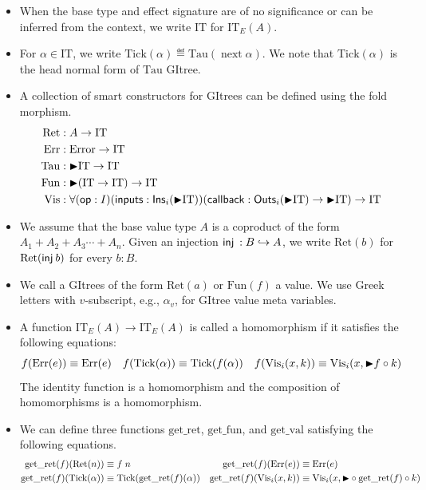 \documentclass{article}
\theoremstyle{definition}
\theoremstyle{plain}
\theoremstyle{remark}
\newcommand{\Error}{\mathrm{Error}}
\newcommand{\Ins}{\mathsf{Ins}}
\newcommand{\Outs}{\mathsf{Outs}}
\newcommand{\IT}{\mathrm{IT}}
\newcommand{\gRet}{\mathrm{Ret}}
\newcommand{\gErr}{\mathrm{Err}}
\newcommand{\gTau}{\mathrm{Tau}}
\newcommand{\gVis}{\mathrm{Vis}}
\newcommand{\gFun}{\mathrm{Fun}}
\newcommand{\Tick}{\mathrm{Tick}}
\DeclareMathOperator*{\Next}{\mathrm{next}}
\newcommand{\getret}{\mathrm{get\_ret}}
\newcommand{\getfun}{\mathrm{get\_fun}}
\newcommand{\getval}{\mathrm{get\_val}}
\begin{document}
\begin{itemize}
  \item When the base type and effect signature are of no significance or can be inferred from the context, we write \(\IT\) for \(\IT_E(A)\).
  \item For \(\alpha \in \IT\), we write \(\Tick(\alpha) \eqdef \gTau(\Next \alpha)\).
    We note that \(\Tick(\alpha)\) is the head normal form of \(\gTau\) GItree.
  \item A collection of smart constructors for GItrees can be defined using the fold morphism.
    \begin{align*}
      \gRet &: A \to \IT \\
      \gErr &: \Error \to \IT \\
      \gTau &: \latert \IT \to \IT \\
      \gFun &: \latert (\IT \to \IT) \to \IT \\
      \gVis &: \forall (\mathsf{op} : I) (\mathsf{inputs} : \Ins_i(\latert \IT)) (\mathsf{callback} : \Outs_i(\latert \IT) \to \latert \IT) \to \IT
    \end{align*}
  \item We assume that the base value type \(A\) is a coproduct of the form \(A_1 + A_2 + A_3 \cdots + A_n\).
    Given an injection \({ {\mathsf{inj}}}_{}\,{} : B\hookrightarrow A\), we write \(\gRet(b)\) for \(\gRet(\vinj{}{b})\) for every \(b:B\).
  \item We call a GItrees of the form \(\gRet(a)\) or \(\gFun(f)\) a value.
    We use Greek letters with \(v\)-subscript, e.g., \(\alpha_v\), for GItree value meta variables.
  \item A function \(\IT_E(A) \to \IT_E(A)\) is called a homomorphism if it satisfies the following equations:
    \[
      f(\gErr(e)) \equiv \gErr(e)
      \quad
      f(\Tick(\alpha)) \equiv \Tick(f(\alpha))
      \quad
      f(\gVis_i(x,k)) \equiv \gVis_i (x, \latert f \circ k)
    \]
    The identity function is a homomorphism and the composition of homomorphisms is a homomorphism.
  \item We can define three functions \(\getret\), \(\getfun\), and \(\getval\) satisfying the following equations.
    \begin{align*}
      \getret(f)(\gRet(n))        &\equiv f\;n
        & \getret(f)(\gErr(e))    &\equiv \gErr(e) \\
      \getret(f)(\Tick(\alpha))   &\equiv \Tick(\getret(f)(\alpha))
        & \getret(f)(\gVis_i(x,k))&\equiv \gVis_i(x, \latert\circ\getret(f)\circ k) \\[6pt]

\end{align*}
\end{itemize}
\end{document}
